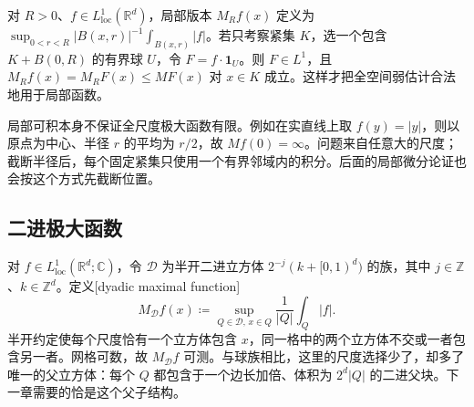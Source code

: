 \ProseParagraphBreak

对 \(R>0\)、\(f\in L^1_{\mathrm{loc}}(\mathbb R^d)\)，局部版本 \(M_Rf(x)\) 定义为 \(\sup_{0<r<R}|B(x,r)|^{-1}\int_{B(x,r)}|f|\)。若只考察紧集 \(K\)，选一个包含 \(K+B(0,R)\) 的有界球 \(U\)，令 \(F=f\cdot\mathbf1_U\)。则 \(F\in L^1\)，且 \(M_Rf(x)=M_RF(x)\leq MF(x)\) 对 \(x\in K\) 成立。这样才把全空间弱估计合法地用于局部函数。

\ProseParagraphBreak

局部可积本身不保证全尺度极大函数有限。例如在实直线上取 \(f(y)=|y|\)，则以原点为中心、半径 \(r\) 的平均为 \(r/2\)，故 \(Mf(0)=\infty\)。问题来自任意大的尺度；截断半径后，每个固定紧集只使用一个有界邻域内的积分。后面的局部微分论证也会按这个方式先截断位置。

\subsection{二进极大函数}
\label{b2:subsec:170103}

对 \(f\in L^1_{\mathrm{loc}}(\mathbb R^d;\mathbb C)\)，令 \(\mathcal D\) 为半开二进立方体 \(2^{-j}(k+[0,1)^d)\) 的族，其中 \(j\in\mathbb Z\)、\(k\in\mathbb Z^d\)。定义[dyadic maximal function]
\[
 M_{\mathcal D}f(x)\coloneqq\sup_{Q\in\mathcal D,\,x\in Q}\dfrac1{|Q|}\int_Q|f|.
\]
半开约定使每个尺度恰有一个立方体包含 \(x\)，同一格中的两个立方体不交或一者包含另一者。网格可数，故 \(M_{\mathcal D}f\) 可测。与球族相比，这里的尺度选择少了，却多了唯一的父立方体：每个 \(Q\) 都包含于一个边长加倍、体积为 \(2^d|Q|\) 的二进父块。下一章需要的恰是这个父子结构。

